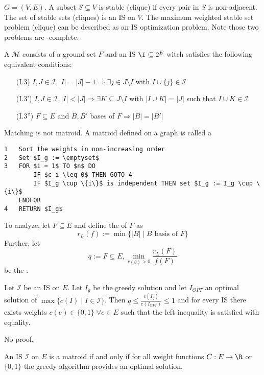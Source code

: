 \begin{xmp+}
$G = (V,E)$. A subset $S \subseteq V$ is stable (clique) if every pair in
$S$ is non-adjacent. The set of stable sets (cliques) is an IS on $V$. The
maximum weighted stable set problem (clique) can be described as an IS
optimization problem. Note those two problems are \npoly-complete.
\end{xmp+}

\begin{defn}\label{def:defn27.4}
A  $\mathcal{M}$ consists of a ground set $F$ and an IS $\I
\subseteq 2^E$ witch satisfies the following equivalent conditions:
\begin{itemize}
\item[(I.3)] $I,J \in \mathcal{I}, |I| = |J|-1 \Rightarrow \exists j \in J\setminus
I$ with $I \cup \{j\} \in \mathcal{I}$
\item[(I.3')] $I,J \in \mathcal{I}, |I| < |J| \Rightarrow \exists K \subseteq J
\setminus I$ with $|I \cup K| = |J|$ such that $I \cup K \in \mathcal{I}$
\item[(I.3'')] $F \subseteq E$ and $B, B'$ bases of $F \Rightarrow |B| =
|B'|$
\end{itemize}
\end{defn}

Matching is not matroid.
A matroid defined on a graph is called a 

\begin{lstlisting}[caption=Greedy algorithm for IS]
1	Sort the weights in non-increasing order
2	Set $I_g := \emptyset$
3	FOR $i = 1$ TO $n$ DO
		IF $c_i \leq 0$ THEN GOTO 4
		IF $I_g \cup \{i\}$ is independent THEN set $I_g := I_g \cup \{i\}$
	ENDFOR
4	RETURN $I_g$
\end{lstlisting}

To analyze, let $F \subseteq E$ and define the  of $F$ as
\[
	r_L(f) := \min \{|B| \mid B \text{ basis of } F\}
\]
Further, let 
\[
	q := F \subseteq E, \min_{r(g) > 0} \frac{r_L(F)}{f(F)}
\]
be the .

\begin{thm}\label{thm:thm27.5}
Let $\mathcal{I}$ be an IS on $E$. Let $I_g$ be the greedy solution and let $I_{OPT}$
an optimal solution of $\max \{ c(I) \mid I \in \mathcal{I}\}$. Then $q \leq
\frac{c(I_g)}{c(I_{OPT})} \leq 1$ and for every IS there exists weights
$c(e) \in \{0, 1\} \;\forall e \in E$ such that the left inequality is
satisfied with equality.
\end{thm}
No proof.

\begin{cor}\label{cor:cor27.6}
An IS $\mathcal{I}$ on $E$ is a matroid if and only if for all weight functions $C: E
\rightarrow \R$ or $\{0,1\}$ the greedy algorithm provides an optimal
solution.
\end{cor}
